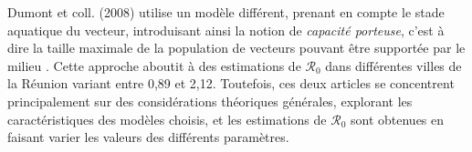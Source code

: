 Dumont et coll. (2008) utilise un modèle différent, prenant en compte le stade aquatique du vecteur, introduisant ainsi la notion de {\em capacité porteuse}, c'est à dire la taille maximale de la population de vecteurs pouvant être supportée par le milieu \cite{dumont2008temporal}.
Cette approche aboutit à des estimations de $\mathcal{R}_0$ dans différentes villes de la Réunion variant entre  0,89 et 2,12.
Toutefois, ces deux articles se concentrent principalement sur des considérations théoriques générales, explorant les caractéristiques des modèles choisis, et les estimations de $\mathcal{R}_0$ sont obtenues en faisant varier les valeurs des différents paramètres. 

